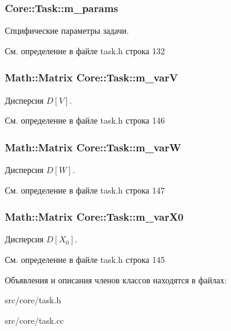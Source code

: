 \subsubsection[{\texorpdfstring{m\+\_\+params}{m_params}}]{ Core\+::\+Task\+::m\+\_\+params\hspace{0.3cm}{\ttfamily [protected]}}\hypertarget{class_core_1_1_task_a99bf439867f7a4f38cde5eb142f4414a}{}\label{class_core_1_1_task_a99bf439867f7a4f38cde5eb142f4414a}
Спцифические параметры задачи. 

См. определение в файле task.\+h строка 132

\subsubsection[{\texorpdfstring{m\+\_\+varV}{m_varV}}]{\setlength{\rightskip}{0pt plus 5cm}Math\+::\+Matrix Core\+::\+Task\+::m\+\_\+varV\hspace{0.3cm}{\ttfamily [protected]}}\hypertarget{class_core_1_1_task_af73402499755e2c2931b9d30456fd06a}{}\label{class_core_1_1_task_af73402499755e2c2931b9d30456fd06a}
Дисперсия $D[V]$. 

См. определение в файле task.\+h строка 146

\subsubsection[{\texorpdfstring{m\+\_\+varW}{m_varW}}]{\setlength{\rightskip}{0pt plus 5cm}Math\+::\+Matrix Core\+::\+Task\+::m\+\_\+varW\hspace{0.3cm}{\ttfamily [protected]}}\hypertarget{class_core_1_1_task_af1239e6079214a8344c44b8ad4c3a23e}{}\label{class_core_1_1_task_af1239e6079214a8344c44b8ad4c3a23e}
Дисперсия $D[W]$. 

См. определение в файле task.\+h строка 147

\subsubsection[{\texorpdfstring{m\+\_\+var\+X0}{m_varX0}}]{\setlength{\rightskip}{0pt plus 5cm}Math\+::\+Matrix Core\+::\+Task\+::m\+\_\+var\+X0\hspace{0.3cm}{\ttfamily [protected]}}\hypertarget{class_core_1_1_task_a06a945ef15de5b97494fd20ce88470a6}{}\label{class_core_1_1_task_a06a945ef15de5b97494fd20ce88470a6}
Дисперсия $D[X_0]$. 

См. определение в файле task.\+h строка 145



Объявления и описания членов классов находятся в файлах\+:\begin{DoxyCompactItemize}
\item 
src/core/task.\+h\item 
src/core/task.\+cc\end{DoxyCompactItemize}
